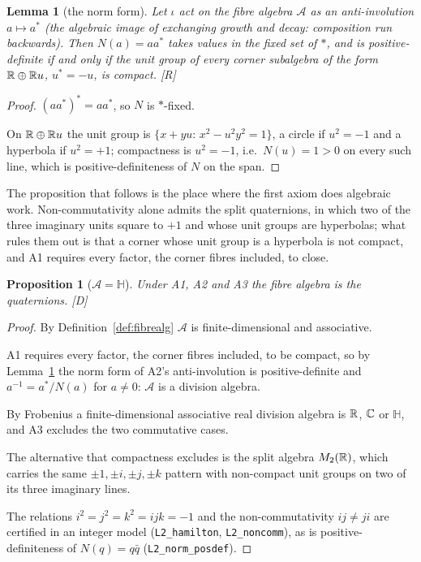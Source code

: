 \documentclass[11pt,a4paper]{article}
\theoremstyle{plain}
\newtheorem{proposition}[theorem]{Proposition}
\newtheorem{lemma}[theorem]{Lemma}
\theoremstyle{definition}
\theoremstyle{remark}
\newcommand{\Hquat}{\mathbb{H}}
\newcommand{\rigR}{[\textup{R}]}
\newcommand{\rigD}{[\textup{D}]}
\begin{document}
\begin{lemma}[the norm form]\label{lem:norm}
Let $\iota$ act on the fibre algebra $\mathcal{A}$ as an anti-involution $a\mapsto a^{*}$ (the algebraic image of exchanging growth and decay: composition run backwards). Then $N(a)=aa^{*}$ takes values in the fixed set of $*$, and is positive-definite if and only if the unit group of every corner subalgebra of the form $\mathbb{R}\oplus\mathbb{R} u$, $u^{*}=-u$, is compact. \rigR
\end{lemma}

\begin{proof}
$(aa^{*})^{*}=aa^{*}$, so $N$ is $*$-fixed.

On $\mathbb{R}\oplus\mathbb{R} u$ the unit group is $\{x+yu:\,x^{2}-u^{2}y^{2}=1\}$, a circle if $u^{2}=-1$ and a hyperbola if $u^{2}=+1$; compactness is $u^{2}=-1$, i.e.\ $N(u)=1>0$ on every such line, which is positive-definiteness of $N$ on the span.
\end{proof}

The proposition that follows is the place where the first axiom does algebraic work. Non-commutativity alone admits the split quaternions, in which two of the three imaginary units square to $+1$ and whose unit groups are hyperbolas; what rules them out is that a corner whose unit group is a hyperbola is not compact, and A1 requires every factor, the corner fibres included, to close.

\begin{proposition}[$\mathcal{A}=\Hquat$]\label{prop:H}
Under A1, A2 and A3 the fibre algebra is the quaternions. \rigD
\end{proposition}

\begin{proof}
By Definition~\ref{def:fibrealg} $\mathcal{A}$ is finite-dimensional and associative.

A1 requires every factor, the corner fibres included, to be compact, so by Lemma~\ref{lem:norm} the norm form of A2's anti-involution is positive-definite and $a^{-1}=a^{*}/N(a)$ for $a\neq0$: $\mathcal{A}$ is a division algebra.

By Frobenius \cite{Frobenius1878} a finite-dimensional associative real division algebra is $\mathbb{R}$, $\mathbb{C}$ or $\Hquat$, and A3 excludes the two commutative cases.

The alternative that compactness excludes is the split algebra $M_{2}(\mathbb{R})$, which carries the same $\pm1,\pm i,\pm j,\pm k$ pattern with non-compact unit groups on two of its three imaginary lines.

The relations $i^{2}=j^{2}=k^{2}=ijk=-1$ and the non-commutativity $ij\neq ji$ are certified in an integer model (\texttt{L2\_hamilton}, \texttt{L2\_noncomm}), as is positive-definiteness of $N(q)=q\bar q$ (\texttt{L2\_norm\_posdef}).
\end{proof}
\end{document}
